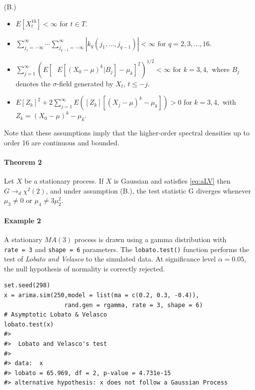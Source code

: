 (B.)

\begin{itemize}
\item
  \(E[X_t^{16}] < \infty\) for \(t \in T.\)
\item
  \(\sum_{j_1 = -\infty}^{\infty}\cdots \sum_{j_{q-1} = -\infty}^{\infty} |k_q(j_1,\ldots,j_{q-1})| < \infty \text{ for } q=2,3,\ldots,16.\)
\item
  \(\sum_{j=1}^{\infty}\left(E \left[\text{ } E[(X_0-\mu)^k|B_j] -\mu_k\right]^2 \right)^{1/2} < \infty \text{  for } k = 3,4,\) where \(B_j\) denotes the \(\sigma\)-field generated by \(X_t\), \(t \leq -j.\)
\item
  \(E\left[Z_k \right]^2 +2\sum_{j=1}^{\infty}E\left(\left[Z_k \right] \left[ (X_j -\mu)^k -\mu_k \right] \right) > 0\) for \(k = 3,4,\) with \(Z_k=(X_0 -\mu)^k -\mu_k.\)
\end{itemize}

Note that these assumptions imply that the higher-order spectral densities up to order 16 are continuous and bounded.

\paragraph{\texorpdfstring{Theorem 2 \citep[Theorem 1]{Lobato2004}}{Theorem 2 {[}@Lobato2004, Theorem 1{]}}}\label{theorem-2-lobato2004-theorem-1}

Let \(X\) be a stationary process. If \(X\) is Gaussian and satisfies \eqref{eq:aLV} then \(G \to_d \chi^2(2)\), and under assumption (B.), the test statistic G diverges whenever \(\mu_3 \neq 0\) or \(\mu_4 \neq 3\mu_2^2.\)

\paragraph{Example 2}\label{example-2}

A stationary \(MA(3)\) process is drawn using a gamma distribution with \texttt{rate\ =\ 3} and \texttt{shape\ =\ 6} parameters. The \texttt{lobato.test()} function performs the test of \emph{Lobato and Velasco} to the simulated data. At significance level \(\alpha = 0.05\), the null hypothesis of normality is correctly rejected.

\begin{verbatim}
set.seed(298)
x = arima.sim(250,model = list(ma = c(0.2, 0.3, -0.4)),
                 rand.gen = rgamma, rate = 3, shape = 6)
# Asymptotic Lobato & Velasco
lobato.test(x)
#> 
#>  Lobato and Velasco's test
#> 
#> data:  x
#> lobato = 65.969, df = 2, p-value = 4.731e-15
#> alternative hypothesis: x does not follow a Gaussian Process
\end{verbatim}

